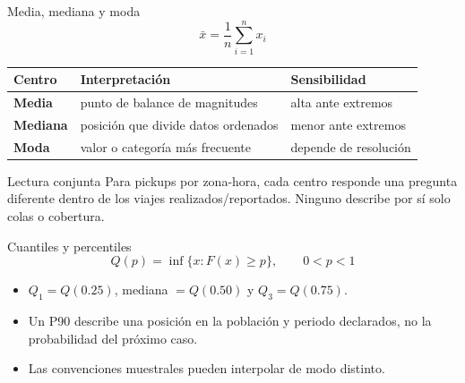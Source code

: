 \documentclass[aspectratio=169,11pt]{beamer}
\begin{document}
\begin{frame}{Media, mediana y moda}
  \small
  \[
    \bar{x}=\frac{1}{n}\sum_{i=1}^{n}x_i
  \]
  \begin{tabularx}{\textwidth}{>{\bfseries}p{} X X}
    \toprule
    Centro & Interpretación & Sensibilidad \\
    \midrule
    Media & punto de balance de magnitudes & alta ante extremos \\
    Mediana & posición que divide datos ordenados & menor ante extremos \\
    Moda & valor o categoría más frecuente & depende de resolución \\
    \bottomrule
  \end{tabularx}
  \vfill
  \begin{block}{Lectura conjunta}
    Para pickups por zona-hora, cada centro responde una pregunta diferente dentro de los viajes realizados/reportados. Ninguno describe por sí solo colas o cobertura.
  \end{block}
\end{frame}

\begin{frame}{Cuantiles y percentiles}
  \small
  \[
    Q(p)=\inf\{x:F(x)\geq p\},\qquad 0<p<1
  \]
  \centering
  \vspace{.5em}
  \begin{itemize}
    \item $Q_1=Q(0.25)$, mediana $=Q(0.50)$ y $Q_3=Q(0.75)$.
    \item Un P90 describe una posición en la población y periodo declarados, no la probabilidad del próximo caso.
    \item Las convenciones muestrales pueden interpolar de modo distinto.
  \end{itemize}
\end{frame}
\end{document}
